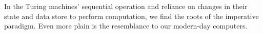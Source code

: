 In the Turing machines' sequential operation and reliance on changes in their state and data store to perform computation, we find the roots of the imperative paradigm. Even more plain is the resemblance to our modern-day computers. %